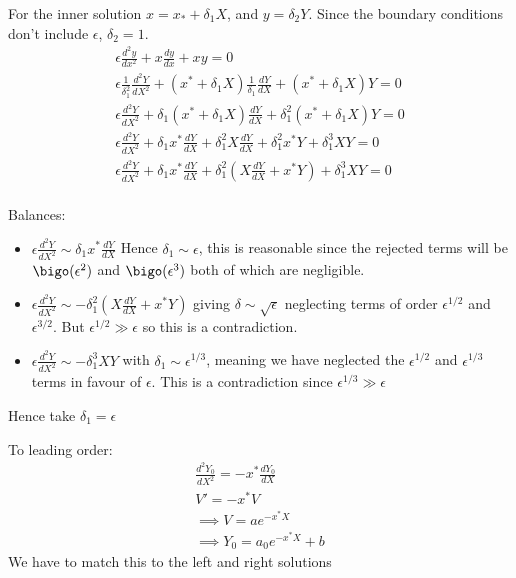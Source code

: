 \documentclass{/home/janmebows/Documents/LatexTemplates/myassignment}
\begin{document}
\begin{enumerate}
	For the inner solution $x = x_* + \delta_1 X$, and $y = \delta_2 Y$. Since the boundary conditions don't include $\epsilon$, $\delta_2 =1$.
	\begin{align*}
		\epsilon \frac{d^2y}{dx^2} + x\frac{dy}{dx} + xy =0\\
		\epsilon \frac{1}{\delta_1^2}\frac{d^2Y}{dX^2} + (x^* + \delta_1X)\frac{1}{\delta_1}\frac{dY}{dX} + (x^* +\delta_1 X)Y =0\\
		\epsilon \frac{d^2Y}{dX^2} + \delta_1 (x^* + \delta_1 X)\frac{dY}{dX} + \delta_1^2 (x^* + \delta_1X)Y = 0\\
		\epsilon \frac{d^2Y}{dX^2} + \delta_1 x^*\frac{dY}{dX} + \delta_1^2 X\frac{dY}{dX} + \delta_1^2 x^*Y+ \delta_1^{3}XY = 0\\
		\epsilon \frac{d^2Y}{dX^2} + \delta_1 x^*\frac{dY}{dX} + \delta_1^2\left( X\frac{dY}{dX} + x^*Y\right)+ \delta_1^{3}XY = 0\\
	\end{align*}
	
	Balances:
	\begin{itemize}
		\item $\epsilon \frac{d^2Y}{dX^2} \sim \delta_1 x^*\frac{dY}{dX}$ Hence $\delta_1 \sim \epsilon$, this is reasonable since the rejected terms will be $\bigo(\epsilon^2)$ and $\bigo(\epsilon^3)$ both of which are negligible.
		\item $\epsilon \frac{d^2Y}{dX^2} \sim - \delta_1^2\left( X\frac{dY}{dX} + x^*Y\right) $ giving $\delta \sim \sqrt{\epsilon}$ neglecting terms of order $\epsilon^{1/2}$ and $\epsilon^{3/2}$. But $\epsilon^{1/2}\gg \epsilon$ so this is a contradiction. 
		\item $\epsilon \frac{d^2Y}{dX^2} \sim - \delta_1^{3}XY $ with $\delta_1 \sim \epsilon^{1/3}$, meaning we have neglected the $\epsilon^{1/2}$ and $\epsilon^{1/3}$ terms in favour of $\epsilon$. This is a contradiction since $\epsilon^{1/3} \gg \epsilon$

	\end{itemize}
	Hence take $\delta_1 = \epsilon$

	To leading order:
	\begin{align*}
	\frac{d^2Y_0}{dX^2} = - x^*\frac{dY_0}{dX}\\
	V' = -x^* V\\
	\implies V = ae^{-x^* X}\\
	\implies Y_0 =a_0 e^{-x^* X} +b
	\end{align*}
	We have to match this to the left and right solutions


\end{enumerate}
\end{document}
